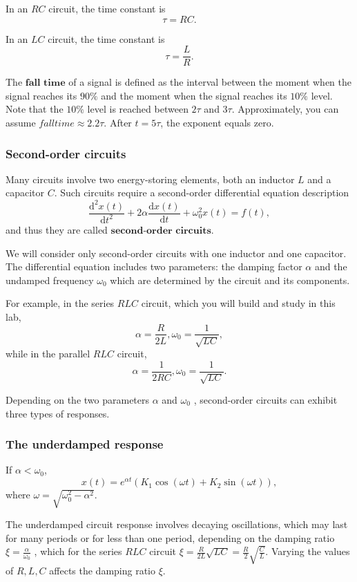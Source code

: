 \documentclass{article}
\begin{document}
In an $RC$ circuit, the time constant is
$$\tau = RC.$$

In an $LC$ circuit, the time constant is
$$\tau = \frac{L}{R}.$$

The $\textbf{fall time}$ of a signal is defined as the interval between the moment when the signal reaches its $90\%$ and the moment when the signal reaches its $10\%$ level. Note that the $10\%$ level is reached between $2\tau$ and $3\tau$. Approximately, you can assume $falltime \approx 2.2\tau$. After $t=5\tau$, the exponent equals zero.

		\subsubsection{Second-order circuits}

Many circuits involve two energy-storing elements, both an inductor $L$ and a capacitor $C$. Such circuits require a second-order differential equation description
$$\frac{\mathrm{d}^2x(t)}{\mathrm{d}t^2} + 2\alpha\frac{\mathrm{d}x(t)}{\mathrm{d}t} + \omega_0^2x(t) = f(t),$$
and thus they are called $\textbf{second-order circuits}$.

We will  consider only second-order circuits with one inductor and one capacitor. The differential equation includes two parameters: the damping factor $\alpha$ and the undamped frequency $\omega_0$ which are determined by the circuit and its components.

For example, in the series $RLC$ circuit, which you will build and study in this lab,
$$\alpha = \frac{R}{2L}, \omega_0 = \frac{1}{\sqrt{LC}},$$
while in the parallel $RLC$ circuit,
$$\alpha = \frac{1}{2RC}, \omega_0 = \frac{1}{\sqrt{LC}}.$$

Depending on the two parameters $\alpha$ and $\omega_0$ , second-order circuits can exhibit three types of responses. 

		\subsubsection{The underdamped response}

If $\alpha < \omega_0$, 
$$x(t) = e^{\alpha t}(K_1\cos(\omega t)+K_2\sin(\omega t)),$$
where $\omega = \sqrt{\omega_0^2 - \alpha^2}$.

The underdamped circuit response involves decaying oscillations, which may last for many periods or for less than one period, depending on the damping ratio $\xi = \frac{\alpha}{\omega_0}$ , which for the series $RLC$ circuit $\xi = \frac{R}{2L} \sqrt{LC} = \frac{R}{2}\sqrt{\frac{C}{L}}$. Varying the values of $R, L, C$ affects the damping ratio $\xi$. 
\end{document}
